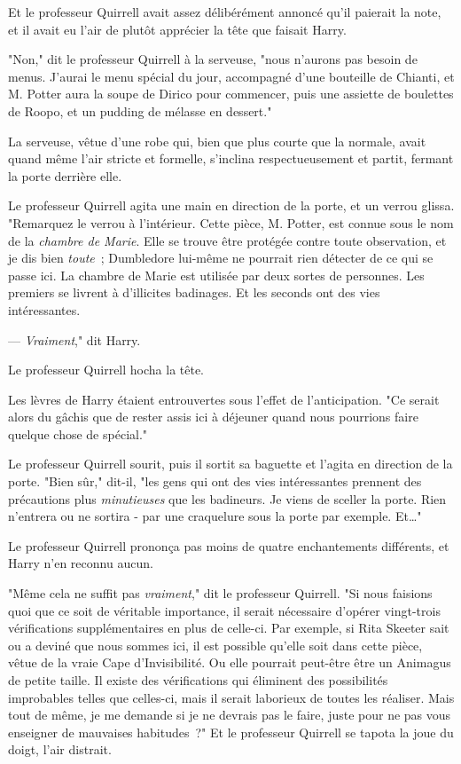 Et le professeur Quirrell avait assez délibérément annoncé qu'il paierait la note, et il avait eu l'air de plutôt apprécier la tête que faisait Harry.

"Non," dit le professeur Quirrell à la serveuse, "nous n'aurons pas besoin de menus. J'aurai le menu spécial du jour, accompagné d'une bouteille de Chianti, et M. Potter aura la soupe de Dirico pour commencer, puis une assiette de boulettes de Roopo, et un pudding de mélasse en dessert."

La serveuse, vêtue d’une robe qui, bien que plus courte que la normale, avait quand même l'air stricte et formelle, s'inclina respectueusement et partit, fermant la porte derrière elle.

Le professeur Quirrell agita une main en direction de la porte, et un verrou glissa. "Remarquez le verrou à l'intérieur. Cette pièce, M. Potter, est connue sous le nom de la \emph{chambre de Marie}. Elle se trouve être protégée contre toute observation, et je dis bien \emph{toute}~; Dumbledore lui-même ne pourrait rien détecter de ce qui se passe ici. La chambre de Marie est utilisée par deux sortes de personnes. Les premiers se livrent à d'illicites badinages. Et les seconds ont des vies intéressantes.

--- \emph{Vraiment}," dit Harry.

Le professeur Quirrell hocha la tête.

Les lèvres de Harry étaient entrouvertes sous l'effet de l'anticipation. "Ce serait alors du gâchis que de rester assis ici à déjeuner quand nous pourrions faire quelque chose de spécial."

Le professeur Quirrell sourit, puis il sortit sa baguette et l'agita en direction de la porte. "Bien sûr," dit-il, "les gens qui ont des vies intéressantes prennent des précautions plus \emph{minutieuses} que les badineurs. Je viens de sceller la porte. Rien n'entrera ou ne sortira - par une craquelure sous la porte par exemple. Et…"

Le professeur Quirrell prononça pas moins de quatre enchantements différents, et Harry n'en reconnu aucun.

"Même cela ne suffit pas \emph{vraiment}," dit le professeur Quirrell. "Si nous faisions quoi que ce soit de véritable importance, il serait nécessaire d'opérer vingt-trois vérifications supplémentaires en plus de celle-ci. Par exemple, si Rita Skeeter sait ou a deviné que nous sommes ici, il est possible qu'elle soit dans cette pièce, vêtue de la vraie Cape d'Invisibilité. Ou elle pourrait peut-être être un Animagus de petite taille. Il existe des vérifications qui éliminent des possibilités improbables telles que celles-ci, mais il serait laborieux de toutes les réaliser. Mais tout de même, je me demande si je ne devrais pas le faire, juste pour ne pas vous enseigner de mauvaises habitudes~?" Et le professeur Quirrell se tapota la joue du doigt, l'air distrait.

